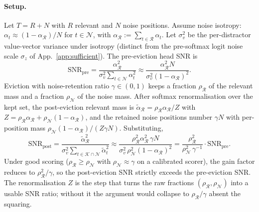 \documentclass{article} %
\begin{document}
\paragraph{Setup.} Let $T = R + N$ with $R$ relevant and $N$ noise positions.
Assume noise isotropy: $\alpha_t \approx (1 - \alpha_{\mathcal{R}}) / N$ for
$t \in \mathcal{N}$, with $\alpha_{\mathcal{R}} := \sum_{t \in \mathcal{R}} \alpha_t$.
Let $\sigma_v^2$ be the per-distractor value-vector variance under isotropy
(distinct from the pre-softmax logit noise scale $\sigma_z$ of
App.~\ref{app:sufficient}). The pre-eviction head SNR is
\[
\mathrm{SNR}_{\mathrm{pre}} = \frac{\alpha_{\mathcal{R}}^2}
{\sigma_v^2 \sum_{t \in \mathcal{N}} \alpha_t^2}
\approx \frac{\alpha_{\mathcal{R}}^2 N}{\sigma_v^2 (1 - \alpha_{\mathcal{R}})^2}.
\]
Eviction with noise-retention ratio $\gamma \in (0, 1)$ keeps a fraction
$\rho_{\mathcal{R}}$ of the relevant mass and a fraction $\rho_{\mathcal{N}}$
of the noise mass. After softmax renormalisation over the kept set, the
post-eviction relevant mass is
$\widetilde{\alpha}_{\mathcal{R}} = \rho_{\mathcal{R}} \alpha_{\mathcal{R}} / Z$
with $Z = \rho_{\mathcal{R}} \alpha_{\mathcal{R}} + \rho_{\mathcal{N}}
(1 - \alpha_{\mathcal{R}})$, and the retained noise positions number
$\gamma N$ with per-position mass $\rho_{\mathcal{N}}(1-\alpha_{\mathcal{R}})/(Z
\gamma N)$. Substituting,
\begin{equation}
\label{eq:scaling-app}
\mathrm{SNR}_{\mathrm{post}}
= \frac{\widetilde{\alpha}_{\mathcal{R}}^2}
{\sigma_v^2 \sum_{t \in \mathcal{K} \cap \mathcal{N}} \widetilde{\alpha}_t^2}
\approx \frac{\rho_{\mathcal{R}}^2 \alpha_{\mathcal{R}}^2 \, \gamma N}
{\sigma_v^2 \, \rho_{\mathcal{N}}^2 (1 - \alpha_{\mathcal{R}})^2}
= \frac{\rho_{\mathcal{R}}^2}{\rho_{\mathcal{N}}^2 \, \gamma^{-1}} \cdot
\mathrm{SNR}_{\mathrm{pre}}.
\end{equation}
Under good scoring ($\rho_{\mathcal{R}} \ge \rho_{\mathcal{N}}$ with
$\rho_{\mathcal{N}} \approx \gamma$ on a calibrated scorer), the gain factor
reduces to $\rho_{\mathcal{R}}^2 / \gamma$, so the post-eviction SNR strictly
exceeds the pre-eviction SNR. The renormalisation $Z$ is the step that turns
the raw fractions $(\rho_{\mathcal{R}}, \rho_{\mathcal{N}})$ into a usable
SNR ratio; without it the argument would collapse to $\rho_{\mathcal{R}}/\gamma$
absent the squaring.
\end{document}
